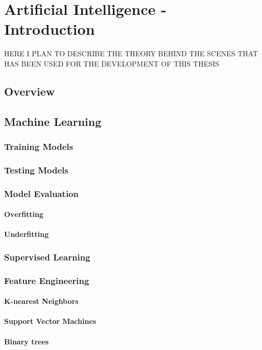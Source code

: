 \acresetall
\chapter{Artificial Intelligence - Introduction}\label{chapter:ml_intro}

HERE I PLAN TO DESCRIBE THE THEORY BEHIND THE SCENES THAT HAS BEEN USED FOR THE DEVELOPMENT OF THIS THESIS

\section{Overview}\label{ch:ml_overview}

\section{Machine Learning}
\subsection{Training Models}
\subsection{Testing Models}
\subsection{Model Evaluation}
\subsubsection{Overfitting}
\subsubsection{Underfitting}
\subsection{Supervised Learning}
\subsection{Feature Engineering}
\subsubsection{K-nearest Neighbors}
\subsubsection{Support Vector Machines}
\subsubsection{Binary trees}
